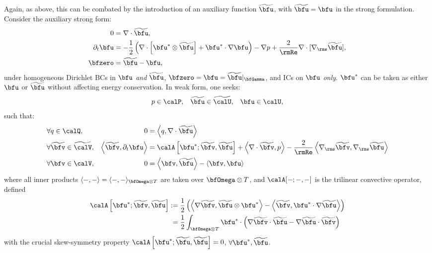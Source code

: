     Again, as above, this can be combated by the introduction of an auxiliary function $\widetilde{\bfu}$, with $\widetilde{\bfu}  =  \bfu$ in the strong formulation. Consider the auxiliary strong form:
    \begin{align}
                       0  &=  \nabla\cdot\widetilde{\bfu},  \\
        \partial_{t}\bfu  &=  - \frac{1}{2}\left(\nabla\cdot\left[\bfu^{*}\otimes\widetilde{\bfu}\right] + \bfu^{*}\cdot\nabla\bfu\right) - \nabla p + \frac{2}{\rmRe}\nabla\cdot[\nabla_{\rms}\widetilde{\bfu}],  \\
                 \bfzero  &=  \widetilde{\bfu} - \bfu,
    \end{align}
    under homogeneous Dirichlet BCs in $\bfu$ \emph{and} $\widetilde{\bfu}$, $\bfzero  =  \bfu  =  \widetilde{\bfu}|_{\bfGamma}$, and ICs on $\bfu$ \emph{only}. $\bfu^{*}$ can be taken as either $\bfu$ or $\widetilde{\bfu}$ without affecting energy conservation. In weak form, one seeks:
    \begin{align}
                       p  \in  \calP,  &&
        \widetilde{\bfu}  \in  \widetilde{\calU},  &&
                    \bfu  \in  \calU,
    \end{align}
    such that:
    \begin{align}
        &\forall                 q  \in  \calQ,              &                                                            0  &=  \left\langle q, \nabla\cdot\widetilde{\bfu}\right\rangle  \\
        &\forall  \widetilde{\bfv}  \in  \widetilde{\calV},  &  \left\langle\widetilde{\bfv}, \partial_{t}\bfu\right\rangle  &=  \calA\left[\bfu^{*}; \widetilde{\bfv}, \widetilde{\bfu}\right] + \left\langle\nabla\cdot\widetilde{\bfv}, p\right\rangle - \frac{2}{\rmRe}\left\langle\nabla_{\rms}\widetilde{\bfv}, \nabla_{\rms}\widetilde{\bfu}\right\rangle  \\
        &\forall              \bfv  \in  \calV,              &                                                            0  &=  \left\langle\bfv, \widetilde{\bfu}\right\rangle - \left\langle\bfv, \bfu\right\rangle
    \end{align}
    where all inner products $\langle -, -\rangle  =  \langle -, -\rangle_{\bfOmega\otimes T}$ are taken over $\bfOmega\otimes T$, and $\calA[-; -, -]$ is the trilinear convective operator, defined
    \begin{align}
        \calA\left[\bfu^{*}; \widetilde{\bfv}, \widetilde{\bfu}\right]  :=  &\;\frac{1}{2}\left(\left\langle\nabla\widetilde{\bfv}, \widetilde{\bfu}\otimes\bfu^{*}\right\rangle - \left\langle\widetilde{\bfv}, \bfu^{*}\cdot\nabla\widetilde{\bfu}\right\rangle\right)  \label{eqn:convective operator definition}  \\
        =  &\;\frac{1}{2}\int_{\bfOmega\otimes T}\bfu^{*}\cdot\left(\nabla\widetilde{\bfv}\cdot\widetilde{\bfu} - \nabla\widetilde{\bfu}\cdot\widetilde{\bfv}\right)
    \end{align}
    with the crucial skew-symmetry property $\calA\left[\bfu^{*}; \widetilde{\bfu}, \widetilde{\bfu}\right] 
     =  0$, $\forall \bfu^{*}, \widetilde{\bfu}$.

